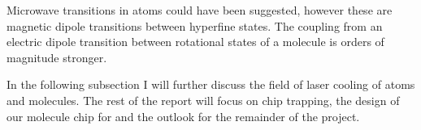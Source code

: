 Microwave transitions in atoms could have been suggested, however these are
magnetic dipole transitions between hyperfine states. The coupling from an
electric dipole transition between rotational states of a molecule is orders of
magnitude stronger. 

In the following subsection I will further discuss the field of laser cooling of
atoms and molecules. The rest of the report will focus on chip trapping, the
design of our molecule chip for \CaF{} and the outlook for the remainder of the
project.
